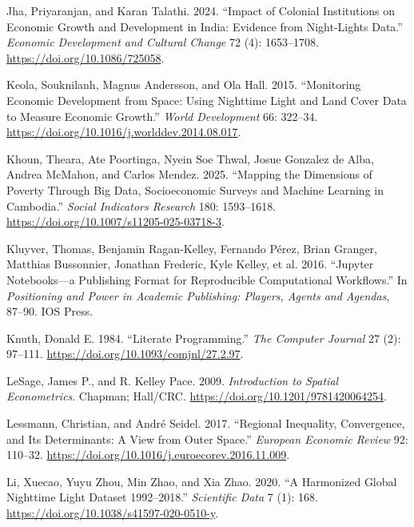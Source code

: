 \documentclass[
  letterpaper,
  DIV=11,
  numbers=noendperiod]{scrartcl}
\newlength{\cslhangindent}
\newenvironment{CSLReferences}[2] %
 {\begin{list}{}{%
  \setlength{\itemindent}{0pt}
  \setlength{\leftmargin}{0pt}
  \setlength{\parsep}{0pt}
  \ifodd #1
   \setlength{\leftmargin}{\cslhangindent}
   \setlength{\itemindent}{-1\cslhangindent}
  \fi
  \setlength{\itemsep}{#2\baselineskip}}}
 {\end{list}}
\begin{document}
\begin{CSLReferences}{1}{0}
Jha, Priyaranjan, and Karan Talathi. 2024. {``Impact of Colonial
Institutions on Economic Growth and Development in {India}: Evidence
from Night-Lights Data.''} \emph{Economic Development and Cultural
Change} 72 (4): 1653--1708. \url{https://doi.org/10.1086/725058}.

Keola, Souknilanh, Magnus Andersson, and Ola Hall. 2015. {``Monitoring
Economic Development from Space: Using Nighttime Light and Land Cover
Data to Measure Economic Growth.''} \emph{World Development} 66:
322--34. \url{https://doi.org/10.1016/j.worlddev.2014.08.017}.

Khoun, Theara, Ate Poortinga, Nyein Soe Thwal, Josue Gonzalez de Alba,
Andrea McMahon, and Carlos Mendez. 2025. {``Mapping the Dimensions of
Poverty Through Big Data, Socioeconomic Surveys and Machine Learning in
{Cambodia}.''} \emph{Social Indicators Research} 180: 1593--1618.
\url{https://doi.org/10.1007/s11205-025-03718-3}.

Kluyver, Thomas, Benjamin Ragan-Kelley, Fernando Pérez, Brian Granger,
Matthias Bussonnier, Jonathan Frederic, Kyle Kelley, et al. 2016.
{``Jupyter Notebooks---a Publishing Format for Reproducible
Computational Workflows.''} In \emph{Positioning and Power in Academic
Publishing: Players, Agents and Agendas}, 87--90. IOS Press.

Knuth, Donald E. 1984. {``Literate Programming.''} \emph{The Computer
Journal} 27 (2): 97--111. \url{https://doi.org/10.1093/comjnl/27.2.97}.

LeSage, James P., and R. Kelley Pace. 2009. \emph{Introduction to
Spatial Econometrics}. Chapman; Hall/CRC.
\url{https://doi.org/10.1201/9781420064254}.

Lessmann, Christian, and André Seidel. 2017. {``Regional Inequality,
Convergence, and Its Determinants: A View from Outer Space.''}
\emph{European Economic Review} 92: 110--32.
\url{https://doi.org/10.1016/j.euroecorev.2016.11.009}.

Li, Xuecao, Yuyu Zhou, Min Zhao, and Xia Zhao. 2020. {``A Harmonized
Global Nighttime Light Dataset 1992--2018.''} \emph{Scientific Data} 7
(1): 168. \url{https://doi.org/10.1038/s41597-020-0510-y}.


\end{CSLReferences}
\end{document}
